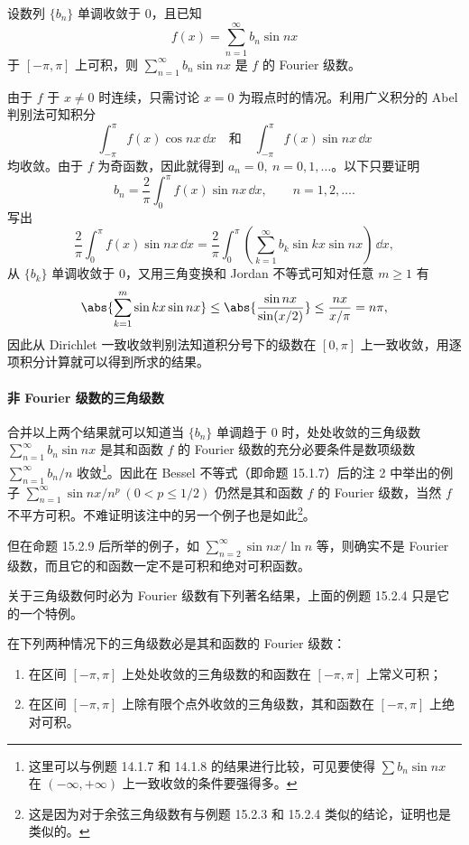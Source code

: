 \begin{xexample}[15.2.4]
设数列 $\{b_n\}$ 单调收敛于 0，且已知
\[
  f(x)=\sum_{n=1}^{\infty}b_n\sin nx
\]
于 $[-\pi,\pi]$ 上可积，则 $\sum_{n=1}^{\infty}b_n\sin nx$ 是 $f$ 的 Fourier 级数。
\end{xexample}
\begin{xproof}
由于 $f$ 于 $x\ne0$ 时连续，只需讨论 $x=0$ 为瑕点时的情况。利用广义积分的 Abel 判别法可知积分
\[
  \int_{-\pi}^{\pi}f(x)\cos nx\,\dd x\quad\text{和}\quad
  \int_{-\pi}^{\pi}f(x)\sin nx\,\dd x
\]
均收敛。由于 $f$ 为奇函数，因此就得到 $a_n=0,\ n=0,1,\ldots$。以下只要证明
\[
  b_n=\frac2\pi\int_0^{\pi}f(x)\sin nx\,\dd x,\qquad n=1,2,\ldots.
\]
写出
\[
  \frac2\pi\int_0^{\pi}f(x)\sin nx\,\dd x
  =\frac2\pi\int_0^{\pi}\left(\sum_{k=1}^{\infty}b_k\sin kx\sin nx\right)\,\dd x,
\]
从 $\{b_k\}$ 单调收敛于 0，又用三角变换和 Jordan 不等式可知对任意 $m\ge1$ 有
\[
  \abs{\sum_{k=1}^{m}\sin kx\sin nx}
  \le\abs{\frac{\sin nx}{\sin(x/2)}}
  \le\frac{nx}{x/\pi}=n\pi,
\]
因此从 Dirichlet 一致收敛判别法知道积分号下的级数在 $[0,\pi]$ 上一致收敛，用逐项积分计算就可以得到所求的结果。
\end{xproof}

\paragraph{非 Fourier 级数的三角级数}
合并以上两个结果就可以知道当 $\{b_n\}$ 单调趋于 0 时，处处收敛的三角级数 $\sum_{n=1}^{\infty}b_n\sin nx$ 是其和函数 $f$ 的 Fourier 级数的充分必要条件是数项级数 $\sum_{n=1}^{\infty}b_n/n$ 收敛\footnote{这里可以与例题 14.1.7 和 14.1.8 的结果进行比较，可见要使得 $\sum b_n\sin nx$ 在 $(-\infty,+\infty)$ 上一致收敛的条件要强得多。}。因此在 Bessel 不等式（即命题 15.1.7）后的注 2 中举出的例子 $\sum_{n=1}^{\infty}\sin nx/n^p\ (0<p\le1/2)$ 仍然是其和函数 $f$ 的 Fourier 级数，当然 $f$ 不平方可积。不难证明该注中的另一个例子也是如此\footnote{这是因为对于余弦三角级数有与例题 15.2.3 和 15.2.4 类似的结论，证明也是类似的。}。

但在命题 15.2.9 后所举的例子，如 $\sum_{n=2}^{\infty}\sin nx/\ln n$ 等，则确实不是 Fourier 级数，而且它的和函数一定不是可积和绝对可积函数。

关于三角级数何时必为 Fourier 级数有下列著名结果，上面的例题 15.2.4 只是它的一个特例。

\begin{xproposition}
在下列两种情况下的三角级数必是其和函数的 Fourier 级数：
\begin{enumerate}[label=(\arabic*)]
  \item 在区间 $[-\pi,\pi]$ 上处处收敛的三角级数的和函数在 $[-\pi,\pi]$ 上常义可积；
  \item 在区间 $[-\pi,\pi]$ 上除有限个点外收敛的三角级数，其和函数在 $[-\pi,\pi]$ 上绝对可积。
\end{enumerate}
\end{xproposition}

